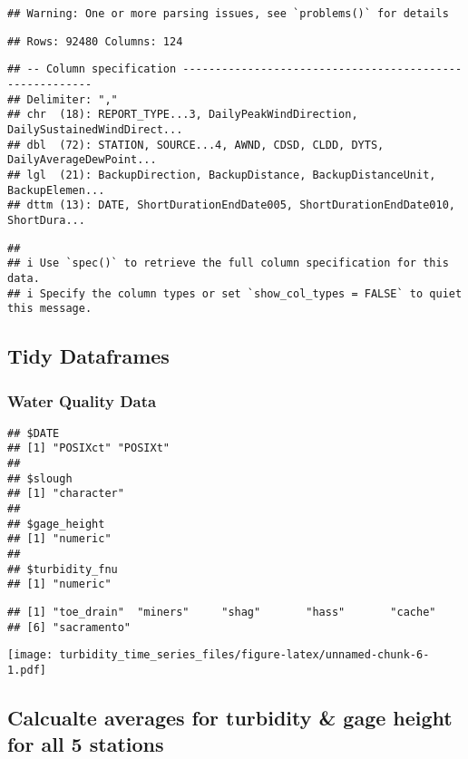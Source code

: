 \documentclass[
]{article}
\begin{document}
\begin{verbatim}
## Warning: One or more parsing issues, see `problems()` for details
\end{verbatim}

\begin{verbatim}
## Rows: 92480 Columns: 124
\end{verbatim}

\begin{verbatim}
## -- Column specification --------------------------------------------------------
## Delimiter: ","
## chr  (18): REPORT_TYPE...3, DailyPeakWindDirection, DailySustainedWindDirect...
## dbl  (72): STATION, SOURCE...4, AWND, CDSD, CLDD, DYTS, DailyAverageDewPoint...
## lgl  (21): BackupDirection, BackupDistance, BackupDistanceUnit, BackupElemen...
## dttm (13): DATE, ShortDurationEndDate005, ShortDurationEndDate010, ShortDura...
\end{verbatim}

\begin{verbatim}
## 
## i Use `spec()` to retrieve the full column specification for this data.
## i Specify the column types or set `show_col_types = FALSE` to quiet this message.
\end{verbatim}

\hypertarget{tidy-dataframes}{%
\subsection{Tidy Dataframes}\label{tidy-dataframes}}

\hypertarget{water-quality-data-1}{%
\subsubsection{Water Quality Data}\label{water-quality-data-1}}

\begin{verbatim}
## $DATE
## [1] "POSIXct" "POSIXt" 
## 
## $slough
## [1] "character"
## 
## $gage_height
## [1] "numeric"
## 
## $turbidity_fnu
## [1] "numeric"
\end{verbatim}

\begin{verbatim}
## [1] "toe_drain"  "miners"     "shag"       "hass"       "cache"     
## [6] "sacramento"
\end{verbatim}

\texttt{[image: turbidity\_time\_series\_files/figure-latex/unnamed-chunk-6-1.pdf]}

\hypertarget{calcualte-averages-for-turbidity-gage-height-for-all-5-stations}{%
\subsection{Calcualte averages for turbidity \& gage height for all 5
stations}\label{calcualte-averages-for-turbidity-gage-height-for-all-5-stations}}
\end{document}
